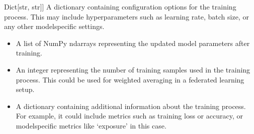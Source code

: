 \documentclass[letterpaper,10pt,english]{sphinxmanual}
\begin{document}
\begin{fulllineitems}
\begin{fulllineitems}
\begin{description}
\begin{description}
\sphinxlineitem{config}{[}Dict{[}str, str{]}{]}
\sphinxAtStartPar
A dictionary containing configuration options for the training process. This may include
hyperparameters such as learning rate, batch size, or any other model\sphinxhyphen{}specific settings.

\end{description}

\begin{description}
\begin{description}
\begin{itemize}
\item {} 
\sphinxAtStartPar
A list of NumPy ndarrays representing the updated model parameters after training.

\item {} 
\sphinxAtStartPar
An integer representing the number of training samples used in the training process. This could be used for weighted averaging in a federated learning setup.

\item {} 
\sphinxAtStartPar
A dictionary containing additional information about the training process. For example, it could include metrics such as training loss or accuracy, or model\sphinxhyphen{}specific metrics like ‘exposure’ in this case.

\end{itemize}

\end{description}

\end{description}

\begin{sphinxVerbatim}[commandchars=\\\{\}]
       
     
\end{sphinxVerbatim}


\end{description}
\end{fulllineitems}
\end{fulllineitems}
\end{document}
